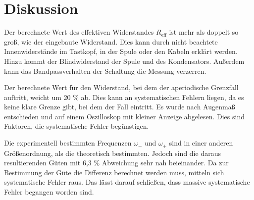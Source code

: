 %

%
\section{Diskussion}
\label{sec:Diskussion}

Der berechnete Wert des effektiven Widerstandes $R_\text{eff}$ ist mehr als doppelt so groß, wie der eingebaute Widerstand. 
Dies kann durch nicht beachtete Innenwiderstände im Tastkopf, in der Spule oder den Kabeln erklärt werden. 
Hinzu kommt der Blindwiderstand der Spule und des Kondensators. Außerdem kann das Bandpassverhalten der Schaltung die Messung verzerren.

\noindent Der berechnete Wert für den Widerstand, bei dem der aperiodische Grenzfall auftritt, weicht um 20 \% ab. Dies kann an systematischen 
Fehlern liegen, da es keine klare Grenze gibt, bei dem der Fall eintritt. Es wurde nach Augenmaß entschieden und auf einem Oszilloskop mit kleiner Anzeige 
abgelesen. Dies sind Faktoren, die systematische Fehler begünstigen.

\noindent Die experimentell bestimmten Frequenzen $\omega_-$ und $\omega_+$ sind in einer anderen Größenordnung, als die theoretisch bestimmten. 
Jedoch sind die daraus resultierenden Güten mit 6,3 \% Abweichung sehr nah beieinander. Da zur Bestimmung der Güte die Differenz berechnet werden muss, 
mitteln sich systematische Fehler raus. Das lässt darauf schließen, dass massive systematische Fehler begangen worden sind.  
 


%
